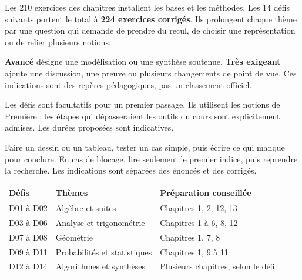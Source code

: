 \clearpage
\gdef\otChapNum{0}\pagestyle{otFront}
\label{defis-debut}
\fontsize{11}{16}\selectfont
Les 210 exercices des chapitres installent les bases et les méthodes. Les
14 défis suivants portent le total à \textbf{224 exercices corrigés}.
Ils prolongent chaque thème par une question qui demande de prendre du recul,
de choisir une représentation ou de relier plusieurs notions.\par\vspace{4mm}
\textbf{Avancé} désigne une modélisation ou une synthèse soutenue.
\textbf{Très exigeant} ajoute une discussion, une preuve ou plusieurs changements de point de vue.
Ces indications sont des repères pédagogiques, pas un classement officiel.\par\vspace{4mm}
Les défis sont facultatifs pour un premier passage. Ils utilisent les notions
de Première ; les étapes qui dépasseraient les outils du cours sont explicitement admises.
Les durées proposées sont indicatives.\par\vspace{5mm}
Faire un dessin ou un tableau, tester un cas simple, puis écrire ce qui manque
pour conclure. En cas de blocage, lire seulement le premier indice, puis reprendre
la recherche. Les indications sont séparées des énoncés et des corrigés.
\begin{center}\renewcommand{\arraystretch}{1.25}
\begin{tabular}{@{}lll@{}}\toprule
Défis & Thèmes & Préparation conseillée\\\midrule
D01 à D02 & Algèbre et suites & Chapitres 1, 2, 12, 13\\
D03 à D06 & Analyse et trigonométrie & Chapitres 1 à 6, 8, 12\\
D07 à D08 & Géométrie & Chapitres 1, 7, 8\\
D09 à D11 & Probabilités et statistiques & Chapitres 1, 9 à 11\\
D12 à D14 & Algorithmes et synthèses & Plusieurs chapitres, selon le défi\\\bottomrule
\end{tabular}\end{center}

